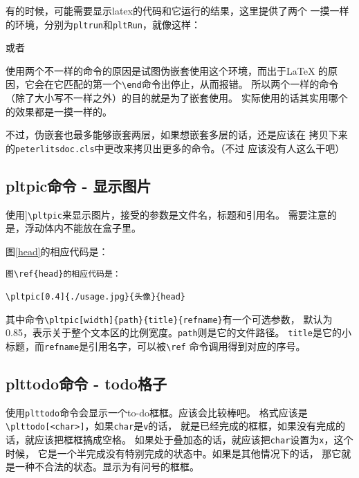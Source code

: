 \documentclass{peterlitsdoc}
\newcommand{\vb}{\verb}
\begin{document}
有的时候，可能需要显示latex的代码和它运行的结果，这里提供了两个
一摸一样的环境，分别为\vb|pltrun|和\verb|pltRun|，就像这样：
\begin{pltRun}
\begin{pltrun}
\end{pltrun}
\end{pltRun}
或者
\begin{pltrun}
\begin{pltRun}
\end{pltRun}
\end{pltrun}

使用两个不一样的命令的原因是试图伪嵌套使用这个环境，而出于\LaTeX
的原因，它会在它匹配的第一个\vb|\end|命令出停止，从而报错。
所以两个一样的命令（除了大小写不一样之外）的目的就是为了嵌套使用。
实际使用的话其实用哪个的效果都是一摸一样的。

不过，伪嵌套也最多能够嵌套两层，如果想嵌套多层的话，还是应该在
拷贝下来的\vb|peterlitsdoc.cls|中更改来拷贝出更多的命令。（不过
应该没有人这么干吧）


\subsection{pltpic命令 - 显示图片}

使用]\vb|\pltpic|来显示图片，接受的参数是文件名，标题和引用名。
需要注意的是，浮动体内不能放在盒子里。

图\ref{head}的相应代码是：

\begin{lstlisting}
图\ref{head}的相应代码是：

\pltpic[0.4]{./usage.jpg}{头像}{head}
\end{lstlisting}


其中命令\vb|\pltpic[width]{path}{title}{refname}|有一个可选参数，
默认为0.85，表示关于整个文本区的比例宽度。\vb|path|则是它的文件路径。
\vb|title|是它的小标题，而\vb|refname|是引用名字，可以被\vb|\ref|
命令调用得到对应的序号。



\subsection{plttodo命令 - todo格子}

使用\vb|plttodo|命令会显示一个to-do框框。应该会比较棒吧。
格式应该是\vb|\plttodo[<char>]|，如果\vb|char|是\vb|v|的话，
就是已经完成的框框，如果没有完成的话，就应该把框框搞成空格。
如果处于叠加态的话，就应该把\vb|char|设置为\vb|x|，这个时候，
它是一个半完成没有特别完成的状态中。如果是其他情况下的话，
那它就是一种不合法的状态。显示为有问号的框框。
\end{document}
